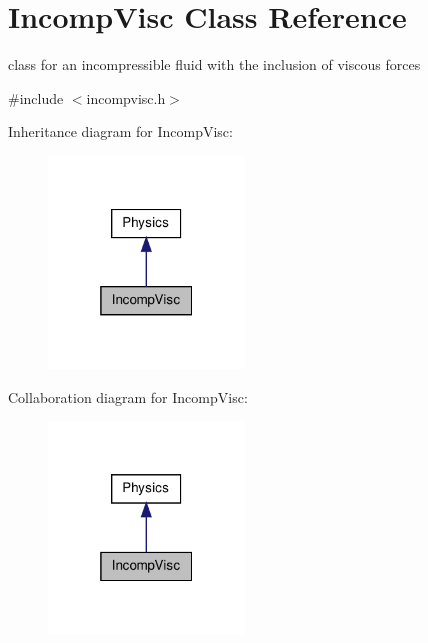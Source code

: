 \hypertarget{classIncompVisc}{\section{\-Incomp\-Visc \-Class \-Reference}
\label{classIncompVisc}
}


class for an incompressible fluid with the inclusion of viscous forces  




{\ttfamily \#include $<$incompvisc.\-h$>$}



\-Inheritance diagram for \-Incomp\-Visc\-:\nopagebreak
\begin{figure}[H]
\begin{center}
\leavevmode
\includegraphics[width=148pt]{classIncompVisc__inherit__graph}
\end{center}
\end{figure}


\-Collaboration diagram for \-Incomp\-Visc\-:\nopagebreak
\begin{figure}[H]
\begin{center}
\leavevmode
\includegraphics[width=148pt]{classIncompVisc__coll__graph}
\end{center}
\end{figure}
